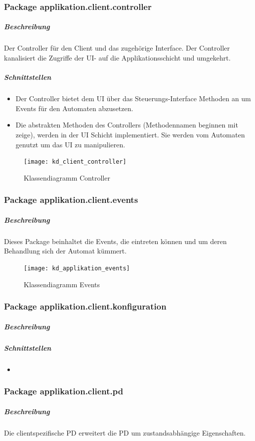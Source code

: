 \documentclass[12pt,halfparskip]{scrartcl}
\begin{document}
	\subsubsection{Package applikation.client.controller}
		\subparagraph{Beschreibung}
		Der Controller für den Client und das zugehörige Interface. Der Controller kanalisiert die Zugriffe der UI- auf die Applikationsschicht und umgekehrt.

		\subparagraph{Schnittstellen}
		\begin{itemize}
			\item Der Controller bietet dem UI über das Steuerungs-Interface Methoden an um Events für den Automaten abzusetzen.
			\item Die abstrakten Methoden des Controllers (Methodennamen beginnen mit zeige), werden in der UI Schicht implementiert. Sie werden vom Automaten genutzt um das UI zu manipulieren.
		\end{itemize}

		\begin{figure}[h]
			\centering
			\texttt{[image: kd\_client\_controller]}
			\caption{Klassendiagramm Controller}
			\label{fig:kd_client_controller}
		\end{figure}
		
	\subsubsection{Package applikation.client.events}
		\subparagraph{Beschreibung}
		Dieses Package beinhaltet die Events, die eintreten können und um deren Behandlung sich der Automat kümmert.
		\begin{figure}[h]
			\centering
			\texttt{[image: kd\_applikation\_events]}
			\caption{Klassendiagramm Events}
			\label{fig:kd_applikation_events}
		\end{figure}
		
	\subsubsection{Package applikation.client.konfiguration}
		\subparagraph{Beschreibung}

		\subparagraph{Schnittstellen}
		\begin{itemize}
			\item 
		\end{itemize}
	
	\subsubsection{Package applikation.client.pd}
		\subparagraph{Beschreibung}
		Die clientspezifische PD erweitert die PD um zustandsabhängige Eigenschaften.
\end{document}

